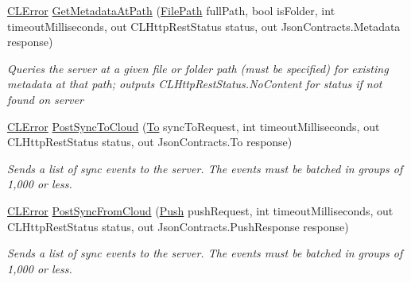 \begin{DoxyCompactItemize}
\hyperlink{class_cloud_api_public_1_1_model_1_1_c_l_error}{C\-L\-Error} \hyperlink{class_cloud_api_public_1_1_r_e_s_t_1_1_c_l_http_rest_a80717799505931b065209f4f52a03433}{Get\-Metadata\-At\-Path} (\hyperlink{class_cloud_api_public_1_1_model_1_1_file_path}{File\-Path} full\-Path, bool is\-Folder, int timeout\-Milliseconds, out C\-L\-Http\-Rest\-Status status, out Json\-Contracts.\-Metadata response)
\begin{DoxyCompactList}\small\item\em Queries the server at a given file or folder path (must be specified) for existing metadata at that path; outputs C\-L\-Http\-Rest\-Status.\-No\-Content for status if not found on server \end{DoxyCompactList}\item 
\hyperlink{class_cloud_api_public_1_1_model_1_1_c_l_error}{C\-L\-Error} \hyperlink{class_cloud_api_public_1_1_r_e_s_t_1_1_c_l_http_rest_a964dc740ab71bbb31fff41e4c66f2ec5}{Post\-Sync\-To\-Cloud} (\hyperlink{class_cloud_api_public_1_1_json_contracts_1_1_to}{To} sync\-To\-Request, int timeout\-Milliseconds, out C\-L\-Http\-Rest\-Status status, out Json\-Contracts.\-To response)
\begin{DoxyCompactList}\small\item\em Sends a list of sync events to the server. The events must be batched in groups of 1,000 or less. \end{DoxyCompactList}\item 
\hyperlink{class_cloud_api_public_1_1_model_1_1_c_l_error}{C\-L\-Error} \hyperlink{class_cloud_api_public_1_1_r_e_s_t_1_1_c_l_http_rest_a729ab72259b315d8c0853f30643ec344}{Post\-Sync\-From\-Cloud} (\hyperlink{class_cloud_api_public_1_1_json_contracts_1_1_push}{Push} push\-Request, int timeout\-Milliseconds, out C\-L\-Http\-Rest\-Status status, out Json\-Contracts.\-Push\-Response response)
\begin{DoxyCompactList}\small\item\em Sends a list of sync events to the server. The events must be batched in groups of 1,000 or less. \end{DoxyCompactList}\end{DoxyCompactItemize}
